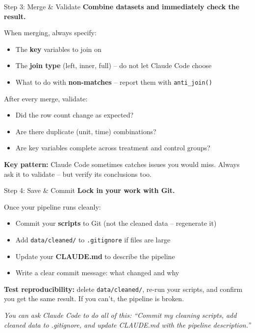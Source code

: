 \begin{frame}{Step 3: Merge \& Validate}
  \textbf{Combine datasets and immediately check the result.}

  \vspace{8pt}

  When merging, always specify:
  \begin{itemize}
    \item The \textbf{key} variables to join on
    \item The \textbf{join type} (left, inner, full) -- do not let Claude Code choose
    \item What to do with \textbf{non-matches} -- report them with \texttt{anti\_join()}
  \end{itemize}

  \vspace{8pt}

  After every merge, validate:
  \begin{itemize}
    \item Did the row count change as expected?
    \item Are there duplicate (unit, time) combinations?
    \item Are key variables complete across treatment and control groups?
  \end{itemize}

  \vspace{8pt}

  \textbf{\textcolor{usfgreen}{Key pattern:}} Claude Code sometimes catches issues you would miss. Always ask it to validate -- but verify its conclusions too.
\end{frame}

\begin{frame}{Step 4: Save \& Commit}
  \textbf{Lock in your work with Git.}

  \vspace{8pt}

  Once your pipeline runs cleanly:
  \begin{itemize}
    \item Commit your \textbf{scripts} to Git (not the cleaned data -- regenerate it)
    \item Add \texttt{data/cleaned/} to \texttt{.gitignore} if files are large
    \item Update your \textbf{CLAUDE.md} to describe the pipeline
    \item Write a clear commit message: what changed and why
  \end{itemize}

  \vspace{8pt}

  \textbf{Test reproducibility:} delete \texttt{data/cleaned/}, re-run your scripts, and confirm you get the same result. If you can't, the pipeline is broken.

  \vspace{8pt}

  \textit{You can ask Claude Code to do all of this: ``Commit my cleaning scripts, add cleaned data to .gitignore, and update CLAUDE.md with the pipeline description.''}
\end{frame}

